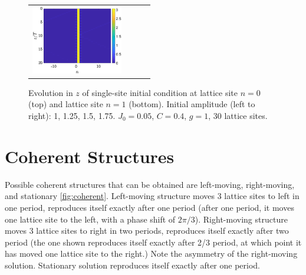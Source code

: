 \documentclass{article}
\begin{document}
\begin{figure}[H]
\begin{tabular}{cccc}
    \includegraphics[width=4cm]{right175}
    \end{tabular}
    \caption{Evolution in $z$ of single-site initial condition at lattice site $n=0$ (top) and lattice site $n=1$ (bottom). Initial amplitude (left to right): 1, 1.25, 1.5, 1.75. $J_0 = 0.05$, $C=0.4$, $g=1$, 30 lattice sites. }
    \label{fig:evolmoving}
\end{figure}

\section{Coherent Structures}

Possible coherent structures that can be obtained are left-moving, right-moving, and stationary \cref{fig:coherent}. Left-moving structure moves 3 lattice sites to left in one period, reproduces itself exactly after one period (after one period, it moves one lattice site to the left, with a phase shift of $2\pi/3$). Right-moving structure moves 3 lattice sites to right in two periods, reproduces itself exactly after two period (the one shown reproduces itself exactly after 2/3 period, at which point it has moved one lattice site to the right.) Note the asymmetry of the right-moving solution. Stationary solution reproduces itself exactly after one period.
\end{document}
